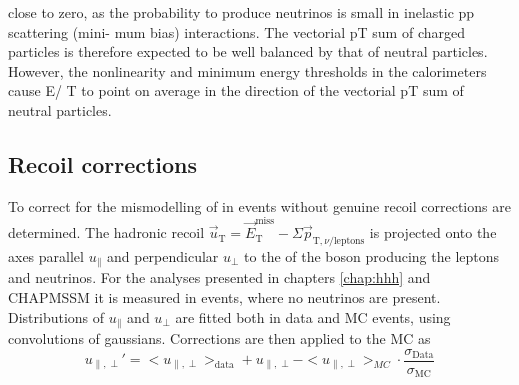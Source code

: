 close to zero, as the probability to produce neutrinos is small in inelastic pp scattering (mini- mum bias) interactions. The vectorial ⃗pT sum of charged particles is therefore expected to be well balanced by that of neutral particles. However, the nonlinearity and minimum energy thresholds in the calorimeters cause ⃗E/ T to point on average in the direction of the vectorial ⃗pT sum of neutral particles.

\subsection{Recoil corrections}
\label{sec:objects_met_recoilcorr}
To correct for the mismodelling of \MET in events without genuine \MET recoil corrections are determined. 
The hadronic recoil $\vec{u}_{\text{T}} = \vec{E}_{\text{T}}^{\text{miss}} - \Sigma \vec{p}_{\text{T},\nu/\text{leptons}}$ 
is projected onto the axes parallel $u_{\parallel}$ and perpendicular $u_{\perp}$ to the \pT of the boson producing the leptons
and neutrinos. For the analyses
presented in chapters \ref{chap:hhh} and CHAPMSSM it is measured in \Zmm events, where no neutrinos
are present. Distributions of $u_{\parallel}$ and $u_{\perp}$ are fitted both in data
and \ac{MC} events, using convolutions of gaussians. Corrections are then applied to the \ac{MC}
as
\begin{equation}\label{eqn:met_recoilcorr}
u_{\parallel,\perp}' = <u_{\parallel,\perp}>_{\text{data}} + u_{\parallel,\perp} - <u_{\parallel,\perp}>_{MC} \cdot \frac{\sigma_{\text{Data}}}{\sigma_{\text{MC}}}
\end{equation}

